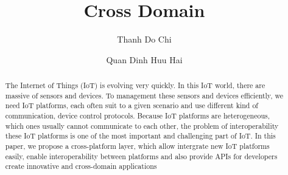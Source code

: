 \documentclass[runningheads,a4paper]{llncs}
\newcommand{\keywords}[1]{\par\addvspace\baselineskip
\noindent\keywordname\enspace\ignorespaces#1}
\begin{document}
\mainmatter  %

\title{Cross Domain}


%
%
\author{Thanh Do Chi \and Quan Dinh Huu Hai}
%


%
%

\maketitle


\begin{abstract}
The Internet of Things (IoT) is evolving very quickly. In this IoT world, there are massive of sensors and devices. To management these sensors and devices efficiently, we need IoT platforms, each often suit to a given scenario and use different kind of communication, device control protocols. Because IoT platforms are heterogeneous, which ones usually cannot communicate to each other, the problem of interoperability these IoT platforms is one of the most important and challenging part of IoT. In this paper, we propose a cross-platform layer, which allow intergrate new IoT platforms easily, enable interoperability between platforms and also provide APIs for developers create innovative and cross-domain applications


\end{abstract}
\newpage
\end{document}
